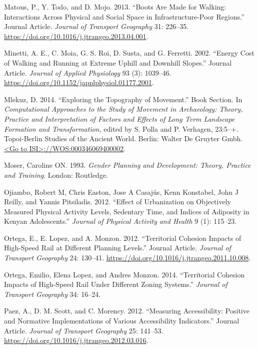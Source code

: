 \documentclass[]{elsarticle} %
\begin{document}
\leavevmode\hypertarget{ref-Matous2013}{}%
Matous, P., Y. Todo, and D. Mojo. 2013. ``Boots Are Made for Walking:
Interactions Across Physical and Social Space in Infrastructure-Poor
Regions.'' Journal Article. \emph{Journal of Transport Geography} 31:
226--35. \url{https://doi.org/10.1016/j.jtrangeo.2013.04.001}.

\leavevmode\hypertarget{ref-Minetti2002}{}%
Minetti, A. E., C. Moia, G. S. Roi, D. Susta, and G. Ferretti. 2002.
``Energy Cost of Walking and Running at Extreme Uphill and Downhill
Slopes.'' Journal Article. \emph{Journal of Applied Physiology} 93 (3):
1039--46. \url{https://doi.org/10.1152/japplphysiol.01177.2001}.

\leavevmode\hypertarget{ref-Mlekuz2014}{}%
Mlekuz, D. 2014. ``Exploring the Topography of Movement.'' Book Section.
In \emph{Computational Approaches to the Study of Movement in
Archaeology: Theory, Practice and Interpretation of Factors and Effects
of Long Term Landscape Formation and Transformation}, edited by S. Polla
and P. Verhagen, 23:5--+. Topoi-Berlin Studies of the Ancient World.
Berlin: Walter De Gruyter Gmbh.
\href{\%3CGo\%20to\%20ISI\%3E://WOS:000346069400002}{\textless{}Go to ISI\textgreater{}://WOS:000346069400002}.

\leavevmode\hypertarget{ref-Moser1993gender}{}%
Moser, Caroline ON. 1993. \emph{Gender Planning and Development: Theory,
Practice and Training}. London: Routledge.

\leavevmode\hypertarget{ref-ojiambo2012}{}%
Ojiambo, Robert M, Chris Easton, Jose A Casajús, Kenn Konstabel, John J
Reilly, and Yannis Pitsiladis. 2012. ``Effect of Urbanization on
Objectively Measured Physical Activity Levels, Sedentary Time, and
Indices of Adiposity in Kenyan Adolescents.'' \emph{Journal of Physical
Activity and Health} 9 (1): 115--23.

\leavevmode\hypertarget{ref-Ortega2012}{}%
Ortega, E., E. Lopez, and A. Monzon. 2012. ``Territorial Cohesion
Impacts of High-Speed Rail at Different Planning Levels.'' Journal
Article. \emph{Journal of Transport Geography} 24: 130--41.
\url{https://doi.org/10.1016/j.jtrangeo.2011.10.008}.

\leavevmode\hypertarget{ref-Ortega2014}{}%
Ortega, Emilio, Elena Lopez, and Andres Monzon. 2014. ``Territorial
Cohesion Impacts of High-Speed Rail Under Different Zoning Systems.''
\emph{Journal of Transport Geography} 34: 16--24.

\leavevmode\hypertarget{ref-Paez2012positive}{}%
Paez, A., D. M. Scott, and C. Morency. 2012. ``Measuring Accessibility:
Positive and Normative Implementations of Various Accessibility
Indicators.'' Journal Article. \emph{Journal of Transport Geography} 25:
141--53. \url{https://doi.org/10.1016/j.jtrangeo.2012.03.016}.
\end{document}
